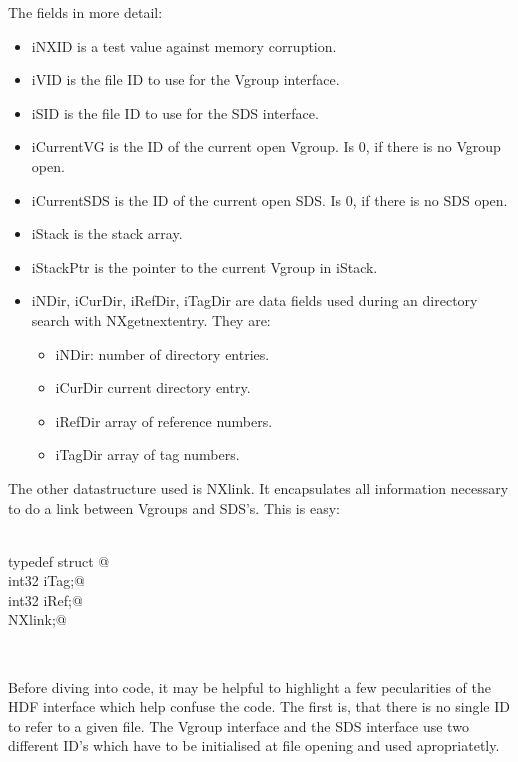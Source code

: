 \documentclass[12pt]{article}
\begin{document}
The fields in more detail: \begin{itemize}
\item iNXID is a test value against memory corruption.
\item iVID is the file ID to use for the Vgroup interface.
\item iSID is the file ID to use for the SDS interface.
\item iCurrentVG is the ID of the current open Vgroup. Is 0, if there is 
 no Vgroup open.
\item iCurrentSDS is the ID of the current open SDS. Is 0, if there is 
 no SDS open.
\item iStack is the stack array.
\item iStackPtr is the pointer to the current Vgroup in iStack.
\item iNDir, iCurDir, iRefDir, iTagDir are data fields used during an
directory search with NXgetnextentry. They are:
\begin{itemize}
\item iNDir: number of directory entries.
\item iCurDir current directory entry.
\item iRefDir array of reference numbers.
\item iTagDir array of tag numbers.

\end{itemize}
\end{itemize} 

The other datastructure used is NXlink. It encapsulates all information
necessary to do a link between Vgroups and SDS's. This is easy:

\begin{flushleft} \small
\begin{minipage}{\linewidth} \label{scrap2}
\vspace{-1ex}
\begin{list}{}{} \item
\mbox{}\verb@@\\
\mbox{}\verb@    typedef struct {@\\
\mbox{}\verb@                    int32 iTag;@\\
\mbox{}\verb@                    int32 iRef;@\\
\mbox{}\verb@                   } NXlink;@\\
\end{list}
\vspace{-1ex}
\footnotesize\addtolength{\baselineskip}{-1ex}
\end{minipage}\\[4ex]
\end{flushleft}
Before diving into code, it may be helpful to highlight a few pecularities
of the HDF interface which help confuse the code. The first is, that there
is no single ID to refer to a given file. The Vgroup interface and the SDS
interface use two different ID's which have to be initialised at file
opening and used apropriatetly.
\end{document}

